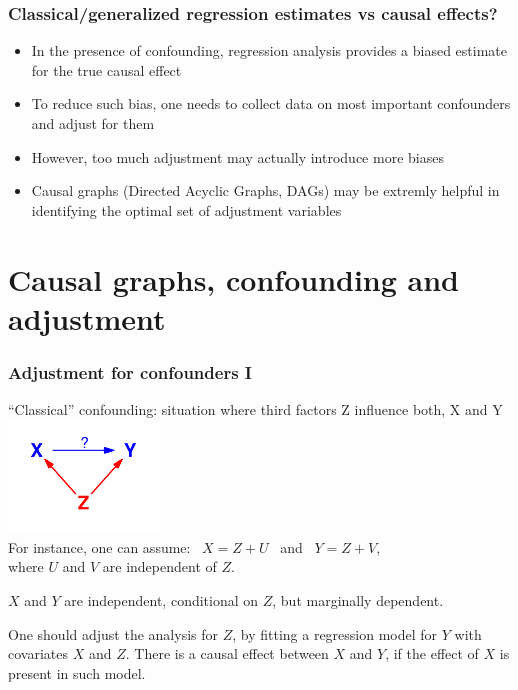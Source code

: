 \documentclass{beamer}
\begin{document}
\begin{frame}
 \frametitle{Classical/generalized regression estimates vs  causal effects?}
 \begin{itemize}
 \item In the presence of confounding, regression analysis provides a biased estimate for the true causal effect
\item To reduce such bias, one needs to collect data on most important confounders and adjust for them
\item However, too much adjustment may actually introduce more biases   
\item Causal graphs (Directed Acyclic Graphs, DAGs) may be extremly helpful in identifying the optimal set of adjustment variables
\end{itemize}
 \end{frame}


\section{Causal graphs, confounding and adjustment}

\begin{frame}
  \frametitle{Adjustment for confounders I}
 ``Classical'' confounding: situation where third factors  Z influence both, X and Y \\[-0.2cm]
\includegraphics[width=4cm]{confound}\\[-0.3cm]
For instance, one can assume: \ $X = Z + U$ \ and \ $Y = Z + V$, \\
where $U$ and $V$ are independent of  $Z$. \pause

$X$ and $Y$ are independent, conditional on $Z$, but marginally dependent.

\alert{One should adjust the analysis for $Z$, by fitting a regression model for $Y$ with covariates
 $X$  and $Z$.} There is a causal effect between $X$ and $Y$, if the effect of $X$ is present in such model.
\end{frame}
\end{document}

